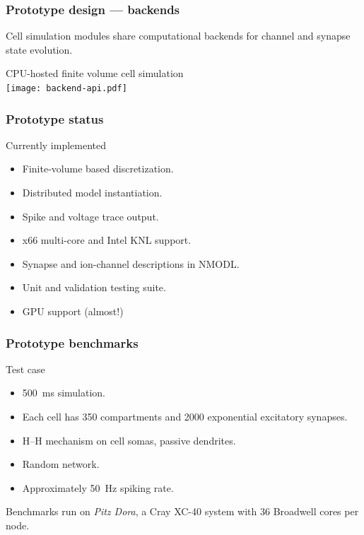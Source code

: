 \documentclass[aspectratio=43,12pt]{beamer}
\newcommand{\subheading}[1]{{\large #1}}
\begin{document}
\begin{frame}
\frametitle{Prototype design --- backends}

Cell simulation modules share computational backends for channel
and synapse state evolution.

\vfill
\centering
CPU-hosted finite volume cell simulation\\
\vspace{2ex}
\texttt{[image: backend-api.pdf]}

\vfill
\end{frame}

\begin{frame}
\frametitle{Prototype status}

\subheading{Currently implemented}

\vfill
\begin{itemize}
\item Finite-volume based discretization.
\item Distributed model instantiation.
\item Spike and voltage trace output.
\item x66 multi-core and Intel KNL support.
\item Synapse and ion-channel descriptions in NMODL.
\item Unit and validation testing suite.
\item GPU support (almost!)
\end{itemize}

\vfill
\vspace{4ex}
\end{frame}

\begin{frame}
\frametitle{Prototype benchmarks}
\subheading{Test case}

\vfill
\begin{itemize}
\item 500~ms simulation.
\item Each cell has 350 compartments and 2000 exponential excitatory synapses.
\item H--H mechanism on cell somas, passive dendrites.
\item Random network.
\item Approximately 50~Hz spiking rate.
\end{itemize}

\vfill
Benchmarks run on \emph{Pitz Dora}, a Cray XC-40 system with 36 Broadwell cores per node.

\vfill
\end{frame}
\end{document}
